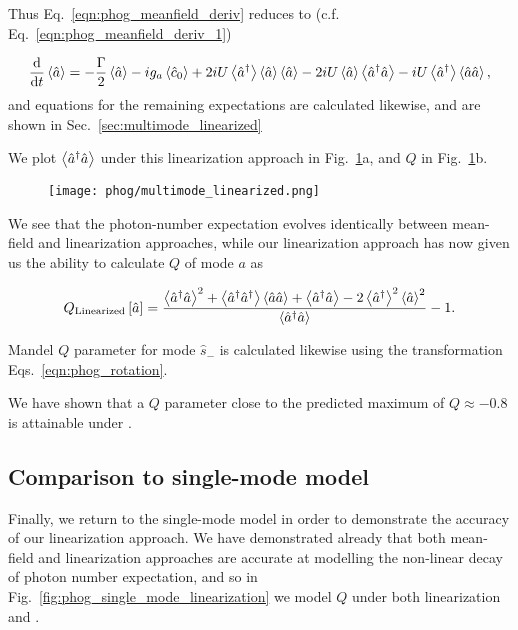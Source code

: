 Thus Eq.~\ref{eqn:phog_meanfield_deriv} reduces to (c.f. Eq.~\ref{eqn:phog_meanfield_deriv_1})

\begin{equation}
\ddt \ev{\hat{a}} = - \frac{\Gamma}{2} \ev{\hat{a}} - i g_a \ev{\hat{c}_0} + 2 i U \ev{\hat{a}^\dagger}\ev{\hat{a}}\ev{\hat{a}} - 2 i U \ev{\hat{a}}\ev{\hat{a}^\dagger \hat{a}} - i U \ev{\hat{a}^\dagger} \ev{\hat{a} \hat{a}},
\end{equation}
and equations for the remaining expectations are calculated likewise, and are shown in Sec.~\ref{sec:multimode_linearized}


We plot $\ev{\hat{a}^\dagger \hat{a}}$ under this linearization approach in Fig.~\ref{fig:phog_multimode_linearized}a, and $Q$ in Fig.~\ref{fig:phog_multimode_linearized}b. 

\begin{figure}[htp]
\centering
\texttt{[image: phog/multimode\_linearized.png]}
\caption{\label{fig:phog_multimode_linearized} }
\end{figure}

We see that the photon-number expectation evolves identically between mean-field and linearization approaches, while our linearization approach has now given us the ability to calculate $Q$ of mode $a$ as

\begin{equation}
Q_{\text{Linearized}}\left[\hat{a}\right] = \frac{\ev{\hat{a}^\dagger \hat{a}}^2 + \ev{\hat{a}^\dagger\hat{a}^\dagger} \ev{\hat{a}\hat{a}} + \ev{\hat{a}^\dagger \hat{a}} - 2 \ev{\hat{a}^\dagger}^2 \ev{\hat{a}}^2}{\ev{\hat{a}^\dagger \hat{a}}} - 1.
\end{equation}

\noindent Mandel $Q$ parameter for mode $\hat{s}_-$ is calculated likewise using the transformation Eqs.~\ref{eqn:phog_rotation}. 

We have shown that a $Q$ parameter close to the predicted maximum of $Q \approx -0.8$ is attainable under .

\subsection{Comparison to single-mode model}
Finally, we return to the single-mode model in order to demonstrate the accuracy of our linearization approach. We have demonstrated already that both mean-field and linearization approaches are accurate at modelling the non-linear decay of photon number expectation, and so in Fig.~\ref{fig:phog_single_mode_linearization} we model $Q$ under both linearization and .

